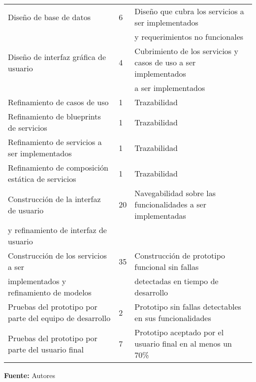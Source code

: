 \begin{table}[h]
\begin{center}
{\begin{tabular}{|l|l|l|}
        
        Diseño de base de datos & 6 & Diseño que cubra los servicios a ser implementados \\ 
        
         &  &  y requerimientos no funcionales \\ 
        
        Diseño de interfaz gráfica de usuario & 4 & Cubrimiento de los servicios y casos de uso a ser implementados \\ 
        
         &  &  a ser implementados \\ 
        
        Refinamiento de casos de uso & 1 & Trazabilidad \\ 
        
        Refinamiento de blueprints de servicios & 1 & Trazabilidad \\ 
        
        Refinamiento de servicios a ser implementados & 1 & Trazabilidad \\ 
        
        Refinamiento de composición estática de servicios & 1 & Trazabilidad \\ 
        
        Construcción de la interfaz de usuario & 20 & Navegabilidad sobre las funcionalidades a ser implementadas \\ 
        
        y refinamiento de interfaz de usuario &  &  \\ 
        
        Construcción de los servicios a ser  & 35 & Construcción de prototipo funcional sin fallas \\ 
        
        implementados y refinamiento de modelos &  & detectadas en tiempo de desarrollo \\ 
        
        Pruebas del prototipo por parte del equipo de desarrollo & 2 & Prototipo sin fallas detectables en sus funcionalidades \\ 
        
        Pruebas del prototipo por parte del usuario final & 7 & Prototipo aceptado por el usuario final en al menos un 70\% \\
        \hline

        \end{tabular}
    }
    \textbf{Fuente:} Autores
  \end{center}
\end{table}
